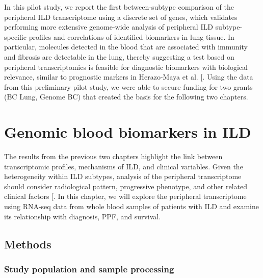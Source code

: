 \documentclass[
]{article}
\begin{document}
In this pilot study, we report the first between-subtype comparison of the peripheral ILD transcriptome using a discrete set of genes, which validates performing more extensive genome-wide analysis of peripheral ILD subtype-specific profiles and correlations of identified biomarkers in lung tissue. In particular, molecules detected in the blood that are associated with immunity and fibrosis are detectable in the lung, thereby suggesting a test based on peripheral transcriptomics is feasible for diagnostic biomarkers with biological relevance, similar to prognostic markers in Herazo-Maya et al. {[}\citeproc{ref-herazo-maya_validating_2017}{100}{]}. Using the data from this preliminary pilot study, we were able to secure funding for two grants (BC Lung, Genome BC) that created the basis for the following two chapters.

\clearpage

\section{Genomic blood biomarkers in ILD}\label{bloodrnaseq}

\renewcommand{\thefigure}{4.\arabic{figure}}
\setcounter{figure}{0}
\renewcommand{\thetable}{4.\arabic{table}}
\setcounter{table}{0}
\renewcommand{\theequation}{4.\arabic{equation}}
\setcounter{equation}{0}

The results from the previous two chapters highlight the link between transcriptomic profiles, mechanisms of ILD, and clinical variables. Given the heterogeneity within ILD subtypes, analysis of the peripheral transcriptome should consider radiological pattern, progressive phenotype, and other related clinical factors {[}\citeproc{ref-ryerson_lumpers_2019}{120}{]}. In this chapter, we will explore the peripheral transcriptome using RNA-seq data from whole blood samples of patients with ILD and examine its relationship with diagnosis, PPF, and survival.

\subsection{Methods}\label{methods-2}

\subsubsection{Study population and sample processing}\label{study-population-and-sample-processing-1}
\end{document}
